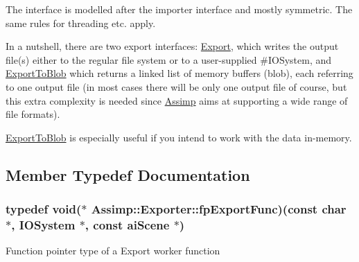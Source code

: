 The interface is modelled after the importer interface and mostly symmetric. The same rules for threading etc. apply.

In a nutshell, there are two export interfaces\-: \hyperlink{class_assimp_1_1_exporter_ab8edf249172567a78ca302278a415e35}{Export}, which writes the output file(s) either to the regular file system or to a user-\/supplied \#\-I\-O\-System, and \hyperlink{class_assimp_1_1_exporter_a390c0950a3a164fc431e0797ae1a84d1}{Export\-To\-Blob} which returns a linked list of memory buffers (blob), each referring to one output file (in most cases there will be only one output file of course, but this extra complexity is needed since \hyperlink{namespace_assimp}{Assimp} aims at supporting a wide range of file formats).

\hyperlink{class_assimp_1_1_exporter_a390c0950a3a164fc431e0797ae1a84d1}{Export\-To\-Blob} is especially useful if you intend to work with the data in-\/memory. 

\subsection{Member Typedef Documentation}
\hypertarget{class_assimp_1_1_exporter_aa67334a75cb24e030af984d01e622f3b}{
\subsubsection[{fp\-Export\-Func}]{\setlength{\rightskip}{0pt plus 5cm}typedef void($\ast$ Assimp\-::\-Exporter\-::fp\-Export\-Func)(const char $\ast$, {\bf I\-O\-System} $\ast$, const ai\-Scene $\ast$)}}\label{class_assimp_1_1_exporter_aa67334a75cb24e030af984d01e622f3b}
Function pointer type of a Export worker function 


